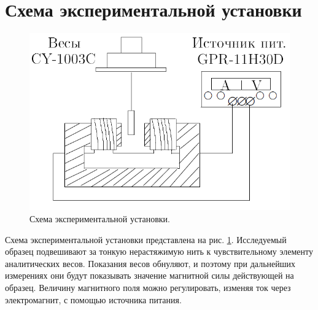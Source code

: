 \section*{Схема экспериментальной установки}

\begin{figure}
	\includegraphics[width=\linewidth]{../res/scheme.png}
	\caption{Схема экспериментальной установки.}
	\label{img:scheme}
\end{figure}

Схема экспериментальной установки представлена на рис. \ref{img:scheme}. Исследуемый образец подвешивают за тонкую нерастяжимую нить к чувствительному элементу аналитических весов. Показания весов обнуляют, и поэтому при дальнейших измерениях они будут показывать значение магнитной силы действующей на образец. Величину магнитного поля можно регулировать, изменяя ток через электромагнит, с помощью источника питания.